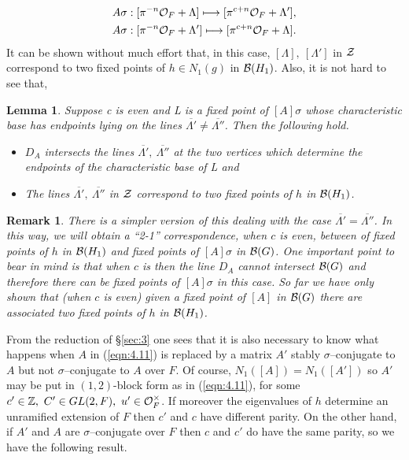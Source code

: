 \documentclass[12pt,letterpaper]{article}
\newtheorem{lemma}[theorem]{Lemma}
\newtheorem{remark}{Remark}
\def\zz{{\cal Z}}
\def\zzz{\mathbb{Z}}
\def\off{{\cal O}_F}
\def\bbg{{\cal B}(G)}
\def\bbH1{{\cal B}(H_1)}
\begin{document}
\begin{equation}
\label{eqn:4.12}
\begin{split}
&A\sigma : [\pi^{-n}\off +\Lambda] \longmapsto [\pi^{c+n}\off +\Lambda '],\\
&A\sigma : [\pi^{-n}\off +\Lambda '] \longmapsto [\pi^{c+n}\off +\Lambda].
\end{split}
\end{equation}
It can be shown without much effort that, in this case,  
$[\Lambda ],\ [\Lambda ']$ in $\zz$ correspond to two fixed points of
$h \in N_1(g)$ in $\bbH1$. Also, it is not hard to see that,

\begin{lemma}
\label{lemma:4.13}
Suppose c is even and L is a fixed point of
$[A]\sigma$ whose characteristic base has endpoints lying on the
lines $\overline{\Lambda '}\not= \overline{\Lambda ''}$. Then 
the following hold.

\begin{itemize}
\item[(a)] 
$D_A$ intersects the lines 
$\overline{\Lambda '},\ \overline{\Lambda ''}$
at the two vertices which determine the endpoints of the characteristic base 
of L and

\item[(b)] 
The lines $\overline{\Lambda '},\ \overline{\Lambda ''}$ in $\zz$
correspond to two fixed points of $h$ in $\bbH1$.
\end{itemize}
\end{lemma}

\begin{remark} 
There is a simpler version of this dealing with the case 
$\overline{\Lambda '}= \overline{\Lambda ''}$.
In this way, we will obtain a ``2-1'' correspondence, when
$c$ is even, between  of fixed points of $h$ in $\bbH1$ and
fixed points of $[A]\sigma$ in $\bbg$. One important point to bear in mind is 
that when $c$ is  then the line $D_A$ cannot intersect $\bbg$
and therefore there can be  fixed points of $[A]\sigma$ in this
case. So far we have only shown that (when $c$ is even) given a fixed point 
of $[A]$ in $\bbg$ there are associated two fixed points
of $h$ in $\bbH1$.
\end{remark}
 
From the reduction of \S \ref{sec:3} 
one sees that it is also necessary to know what
happens when $A$ in (\ref{eqn:4.11}) is replaced by a matrix $A'$ 
stably $\sigma$--conjugate
to $A$ but not $\sigma$--conjugate to $A$ over $F$. Of course, 
$N_1([A])=N_1([A'])$ so $A'$ may be put in $(1,2)$-block 
form as in (\ref{eqn:4.11}),
for some $c'\in\zzz ,\ C'\in GL(2,F),\ u'\in\off^{\times}$. 
If moreover the eigenvalues of $h$ determine an unramified 
extension of $F$ then
$c'$ and $c$ have different parity. On the other hand, if $A'$ and $A$
are $\sigma$--conjugate over $F$ then $c$ and $c'$ do have the same parity, so
we have the following result.
\end{document}
